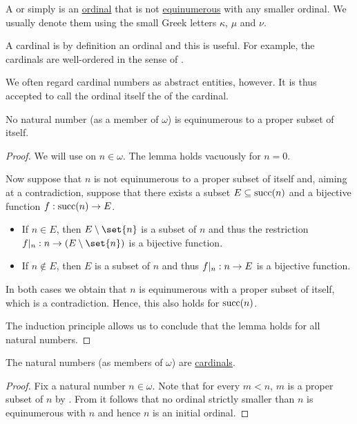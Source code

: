 \begin{definition}\label{def:cardinal}
  A  or simply  is an \hyperref[def:ordinal]{ordinal} that is not \hyperref[def:equinumerosity]{equinumerous} with any smaller ordinal. We usually denote them using the small Greek letters \( \kappa \), \( \mu \) and \( \nu \).

  A cardinal is by definition an ordinal and this is useful. For example, the cardinals are well-ordered in the sense of .

  We often regard cardinal numbers as abstract entities, however. It is thus accepted to call the ordinal itself the  of the cardinal.
\end{definition}

\begin{lemma}\label{thm:natural_number_is_not_equinumerous_to_proper_subset}
  No natural number (as a member of \hyperref[thm:smallest_inductive_set_existence]{\( \omega \)}) is equinumerous to a proper subset of itself.
\end{lemma}
\begin{proof}
  We will use  on \( n \in \omega \). The lemma holds vacuously for \( n = 0 \).

  Now suppose that \( n \) is not equinumerous to a proper subset of itself and, aiming at a contradiction, suppose that there exists a subset \( E \subseteq \operatorname{succ}(n) \) and a bijective function \( {f: \operatorname{succ}(n) \to E} \).
  \begin{itemize}
    \item If \( n \in E \), then \( E \setminus \set{ n } \) is a subset of \( n \) and thus the restriction \( f\restr_n: n \to (E \setminus \set{ n }) \) is a bijective function.
    \item If \( n \not\in E \), then \( E \) is a subset of \( n \) and thus \( f\vert_n: n \to E \) is a bijective function.
  \end{itemize}

  In both cases we obtain that \( n \) is equinumerous with a proper subset of itself, which is a contradiction. Hence, this also holds for \( \operatorname{succ}(n) \).

  The induction principle allows us to conclude that the lemma holds for all natural numbers.
\end{proof}

\begin{proposition}\label{thm:natural_numbers_are_cardinals}
  The natural numbers (as members of \hyperref[thm:smallest_inductive_set_existence]{\( \omega \)}) are \hyperref[def:cardinal]{cardinals}.
\end{proposition}
\begin{proof}
  Fix a natural number \( n \in \omega \). Note that for every \( m < n \), \( m \) is a proper subset of \( n \) by . From  it follows that no ordinal strictly smaller than \( n \) is equinumerous with \( n \) and hence \( n \) is an initial ordinal.
\end{proof}

